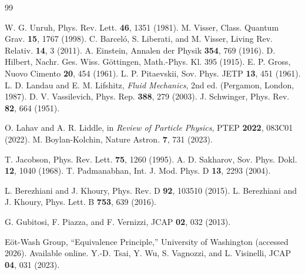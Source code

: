 \documentclass[11pt,a4paper]{article}
\begin{document}
\begin{thebibliography}{99}

 W. G. Unruh, Phys. Rev. Lett. \textbf{46}, 1351 (1981).
 M. Visser, Class. Quantum Grav. \textbf{15}, 1767 (1998).
 C. Barcel\'{o}, S. Liberati, and M. Visser, Living Rev. Relativ. \textbf{14}, 3 (2011).
 A. Einstein, Annalen der Physik \textbf{354}, 769 (1916).
 D. Hilbert, Nachr. Ges. Wiss. G\"ottingen, Math.-Phys. Kl. 395 (1915).
 E. P. Gross, Nuovo Cimento \textbf{20}, 454 (1961).
 L. P. Pitaevskii, Sov. Phys. JETP \textbf{13}, 451 (1961).
 L. D. Landau and E. M. Lifshitz, \textit{Fluid Mechanics}, 2nd ed. (Pergamon, London, 1987).
 D. V. Vassilevich, Phys. Rep. \textbf{388}, 279 (2003).
 J. Schwinger, Phys. Rev. \textbf{82}, 664 (1951).

 O. Lahav and A. R. Liddle, in \textit{Review of Particle Physics}, PTEP \textbf{2022}, 083C01 (2022).
 M. Boylan-Kolchin, Nature Astron. \textbf{7}, 731 (2023).

 T. Jacobson, Phys. Rev. Lett. \textbf{75}, 1260 (1995). %
 A. D. Sakharov, Sov. Phys. Dokl. \textbf{12}, 1040 (1968). %
 T. Padmanabhan, Int. J. Mod. Phys. D \textbf{13}, 2293 (2004). %

 L. Berezhiani and J. Khoury, Phys. Rev. D \textbf{92}, 103510 (2015). %
 L. Berezhiani and J. Khoury, Phys. Lett. B \textbf{753}, 639 (2016). %

 G. Gubitosi, F. Piazza, and F. Vernizzi, JCAP \textbf{02}, 032 (2013). %

 E\"ot-Wash Group, ``Equivalence Principle,'' University of Washington (accessed 2026). Available online.
 Y.-D. Tsai, Y. Wu, S. Vagnozzi, and L. Visinelli,
JCAP \textbf{04}, 031 (2023).

\end{thebibliography}
\end{document}
